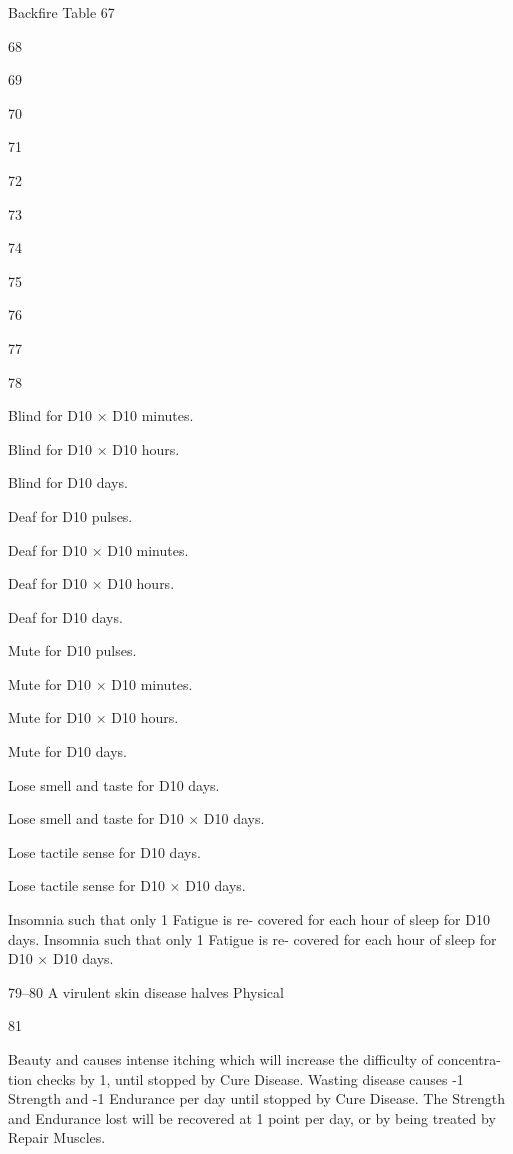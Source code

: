 \begin{Chapter}{Backfire Table}
67  

68  

69  

70  

71  

72  

73  

74  

75  

76  

77  

78  

Blind for D10 × D10 minutes. 

Blind for D10 × D10 hours. 

Blind for D10 days. 

Deaf for D10 pulses. 

Deaf for D10 × D10 minutes. 

Deaf for D10 × D10 hours. 

Deaf for D10 days. 

Mute for D10 pulses. 

Mute for D10 × D10 minutes. 

Mute for D10 × D10 hours. 

Mute for D10 days. 

Lose smell and taste for D10 days. 

Lose smell and taste for D10 × D10 days. 

Lose tactile sense for D10 days. 

Lose tactile sense for D10 × D10 days. 

Insomnia such that only 1 Fatigue is re-
covered for each hour of sleep for D10 
days. 
Insomnia such that only 1 Fatigue is re-
covered for each hour of sleep for D10 × 
D10 days. 

79–80   A virulent skin disease halves Physical 

81  

Beauty and causes intense itching which 
will increase the difficulty of concentra-
tion checks by 1, until stopped by Cure 
Disease. 
Wasting disease causes -1 Strength and -1 
Endurance per day until stopped by Cure 
Disease. The Strength and Endurance lost 
will be recovered at 1 point per day, or by 
being treated by Repair Muscles. 

\end{Chapter}
